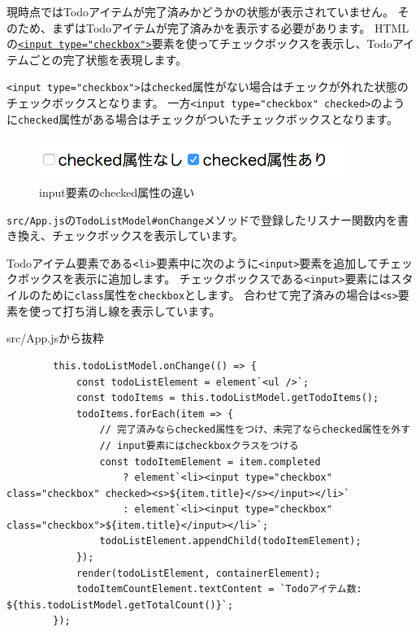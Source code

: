 現時点ではTodoアイテムが完了済みかどうかの状態が表示されていません。
そのため、まずはTodoアイテムが完了済みかを表示する必要があります。
HTMLの\href{https://developer.mozilla.org/ja/docs/Web/HTML/Element/Input/checkbox}{\texttt{<input type="checkbox">}}要素を使ってチェックボックスを表示し、Todoアイテムごとの完了状態を表現します。

\texttt{<input type="checkbox">}は\texttt{checked}属性がない場合はチェックが外れた状態のチェックボックスとなります。
一方\texttt{<input type="checkbox" checked>}のように\texttt{checked}属性がある場合はチェックがついたチェックボックスとなります。

\begin{figure}
\centering
\includegraphics[width=100mm]{./fig/input-checkbox.png}
\caption{input要素のchecked属性の違い}
\end{figure}

\texttt{src/App.js}の\texttt{TodoListModel\#onChange}メソッドで登録したリスナー関数内を書き換え、チェックボックスを表示しています。

Todoアイテム要素である\texttt{<li>}要素中に次のように\texttt{<input>}要素を追加してチェックボックスを表示に追加します。
チェックボックスである\texttt{<input>}要素にはスタイルのために\texttt{class}属性を\texttt{checkbox}とします。
合わせて完了済みの場合は\texttt{<s>}要素を使って打ち消し線を表示しています。

\begin{listtitle}
src/App.jsから抜粋
\end{listtitle}
\begin{lstlisting}
        this.todoListModel.onChange(() => {
            const todoListElement = element`<ul />`;
            const todoItems = this.todoListModel.getTodoItems();
            todoItems.forEach(item => {
                // 完了済みならchecked属性をつけ、未完了ならchecked属性を外す
                // input要素にはcheckboxクラスをつける
                const todoItemElement = item.completed
                    ? element`<li><input type="checkbox" class="checkbox" checked><s>${item.title}</s></input></li>`
                    : element`<li><input type="checkbox" class="checkbox">${item.title}</input></li>`;
                todoListElement.appendChild(todoItemElement);
            });
            render(todoListElement, containerElement);
            todoItemCountElement.textContent = `Todoアイテム数: ${this.todoListModel.getTotalCount()}`;
        });
\end{lstlisting}
\listend

